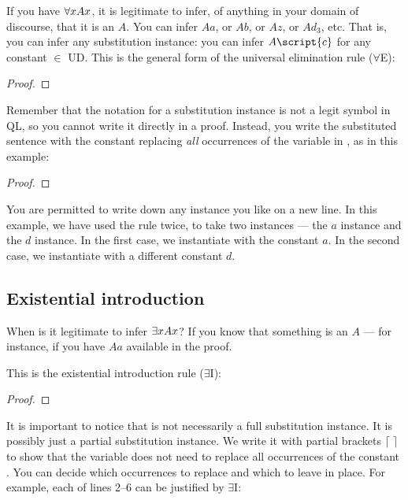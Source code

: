 If you have $\forall x Ax$, it is legitimate to infer, of anything in your domain of discourse, that it is an $A$. You can infer $Aa$, or $Ab$, or $Az$, or $Ad_3$, etc. That is, you can infer any substitution instance: you can infer $A\script{c}$ for any constant  $\in$ UD. This is the general form of the universal elimination rule ($\forall$E):

\begin{proof}
	 
\end{proof}


Remember that the notation for a substitution instance is not a legit symbol in QL, so you cannot write it directly in a proof. Instead, you write the substituted sentence with the constant  replacing \textit{all} occurrences of the variable  in \metaA{}, as in this example:

\begin{proof}
	 \pr{}
	 
	 
\end{proof}

You are permitted to write down any instance you like on a new line. In this example, we have used the rule twice, to take two instances --- the $a$ instance and the $d$ instance. In the first case, we instantiate with the constant $a$. In the second case, we instantiate with a different constant $d$. 

\subsection{Existential introduction}

When is it legitimate to infer $\exists x Ax$? If you know that something is an $A$ --- for instance, if you have $Aa$ available in the proof.

This is the existential introduction rule ($\exists$I):

\begin{proof}
	 
\end{proof}

It is important to notice that \metaA{} is not necessarily a full substitution instance. It is possibly just a partial substitution instance. We write it with partial brackets $\lceil \; \rceil$ to show that the variable  does not need to replace all occurrences of the constant . You can decide which occurrences to replace and which to leave in place. For example, each of lines 2--6 can be justified by $\exists${}I:

